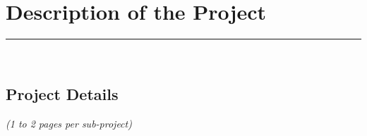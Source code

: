 \documentclass [a4paper, 12pt]{article}
\begin{document}
\section{Description of the Project}
\label{sec:desc}
\rule{\textwidth}{0.4pt}\\
\subsection{Project Details}



\textit{(1 to 2 pages per sub-project)}
\end{document}
